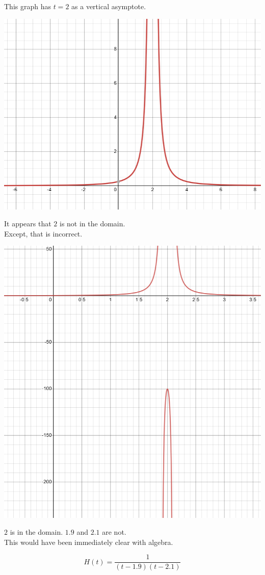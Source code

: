 \documentclass{ximera}
\begin{document}
\begin{example}


This graph has $t=2$ as a vertical asymptote.

\begin{image}
\includegraphics{pics/graph_2A.png}
\end{image}

It appears that $2$ is not in the domain. \\


Except, that is incorrect.

\begin{image}
\includegraphics{pics/graph_2B.png}
\end{image}


$2$ is in the domain. $1.9$ and $2.1$ are not. \\


This would have been immediately clear with algebra.

\[  H(t) = \frac{1}{(t-1.9)(t-2.1)}     \]


\end{example}
\end{document}
